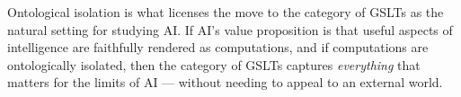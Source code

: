 \begin{remark}
Ontological isolation is what licenses the move to the category of
GSLTs as the natural setting for studying AI.
If AI's value proposition is that useful aspects of intelligence
are faithfully rendered as computations, and if computations are
ontologically isolated, then the category of GSLTs captures
\emph{everything} that matters for the limits of AI --- without
needing to appeal to an external world.
\end{remark}

